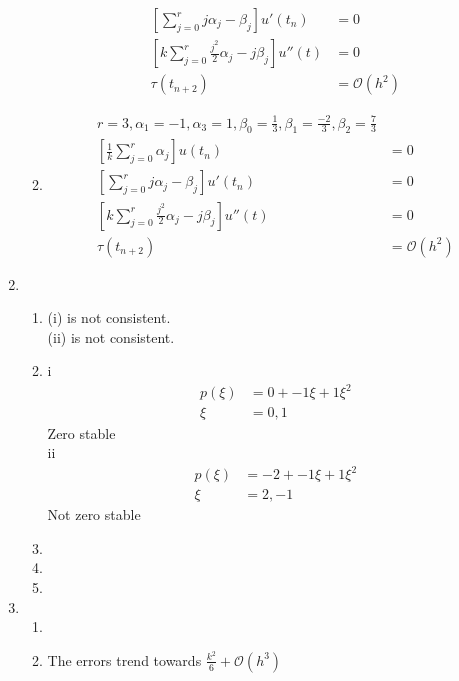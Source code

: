 \documentclass{article}
\begin{document}
\begin{enumerate}
\begin{enumerate}
\begin{equation*}
\begin{split}
		[\sum_{j=0}^{r} j\alpha_{j} - \beta_{j}] u'(t_{n}) & = 0 \\
		[k \sum_{j=0}^{r} \frac{j^{2}}{2} \alpha_{j} - j \beta_{j}] u''(t) & =  0 \\
		\tau(t_{n+2}) & = \mathcal{O}(h^{2}) 
		\end{split}
		\end{equation*}
\item
		\begin{equation*}
		\begin{split}
		r=3, \alpha_{1} = -1, \alpha_{3} = 1, \beta_{0} = \frac{1}{3}, \beta_{1} = \frac{-2}{3}, \beta_{2} = \frac{7}{3} \\
		[\frac{1}{k} \sum_{j=0}^{r} \alpha_{j}] u(t_{n}) & = 0 \\
		[\sum_{j=0}^{r} j\alpha_{j} - \beta_{j}] u'(t_{n}) & = 0 \\
		[k \sum_{j=0}^{r} \frac{j^{2}}{2} \alpha_{j} - j \beta_{j}] u''(t) & =  0 \\
		\tau(t_{n+2}) & = \mathcal{O}(h^{2}) 
		\end{split}
		\end{equation*}
	\end{enumerate}
\item
	\begin{enumerate}
	\item 
(i) is not consistent. \\
(ii) is not consistent.
	\item 
i
		\begin{equation*}
		\begin{split}
		p(\xi) &= 0 + -1\xi + 1\xi^{2} \\
		\xi & = 0,1
		\end{split}
		\end{equation*}
Zero stable \\
ii
		\begin{equation*}
		\begin{split}
		p(\xi) &= -2 + -1\xi + 1\xi^{2} \\
		\xi & = 2, -1
		\end{split}
		\end{equation*}
Not zero stable
	\item
	\item
	\item
	\end{enumerate}
\item
\begin{enumerate}
\item
\item
The errors trend towards $\frac{k^{2}}{6} + \mathcal{O}(h^{3})$ 
\end{enumerate}
\end{enumerate}
\end{document}
